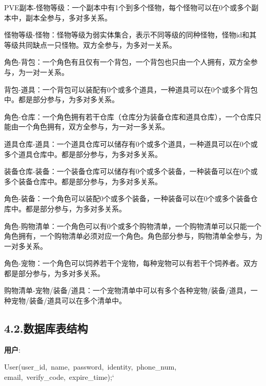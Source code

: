 \documentclass{article}
\begin{document}
PVE副本-怪物等级：一个副本中有1个到多个怪物，每个怪物可以在0个或多个副本中，副本全参与，多对多关系。%

怪物等级-怪物：怪物等级为弱实体集合，表示不同等级的同种怪物，怪物id和其等级共同缺点一只怪物。双方全参与，为多对一关系。%

角色-背包：一个角色有且仅有一个背包，一个背包也只由一个人拥有，双方全参与，为一对一关系。%

背包-道具：一个背包可以装配有0个或多个道具，一种道具可以在0个或多个背包中。都是部分参与，为多对多关系。%

角色-仓库：一个角色拥有若干仓库（仓库分为装备仓库和道具仓库），一个仓库只能由一个角色拥有，双方全参与，为一对一多关系。%

道具仓库-道具：一个道具仓库可以储存有0个或多个道具，一种道具可以在0个或多个道具仓库中。都是部分参与，为多对多关系。%

装备仓库-装备：一个装备仓库可以储存有0个或多个装备，一种装备可以在0个或多个装备仓库中。都是部分参与，为多对多关系。%

角色-装备：一个角色可以装配0个或多个装备，一种装备可以在0个或多个装备仓库中。都是部分参与，为多对多关系。%

角色-购物清单：一个角色可以有0个或多个购物清单，一个购物清单可以只能一个角色拥有，一个购物清单必须对应一个角色。角色部分参与，购物清单全参与，为一对多关系。%

角色-宠物：一个角色可以饲养若干个宠物，每种宠物可以有若干个饲养者。双方都是部分参与，为多对多关系。%

购物清单-宠物/装备/道具：一个宠物清单中可以有多个各种宠物/装备/道具，一种宠物/装备/道具可以在多个清单中。%

\subsection{4.2.\hspace*{0.5em}数据库表结构}\label{42}%

\noindent{}\textbf{用户}:%
\begin{mdpre}%
\noindent User(user\_id,~name,~password,~identity,~phone\_num,\\
email,~verify\_code,~expire\_time);`%
\end{mdpre}
\mdhr{}%
\end{document}
